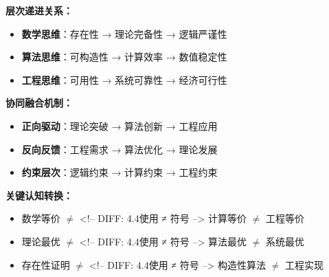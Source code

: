 \begin{tcolorbox}[colback=blue!5!white,colframe=blue!75!black,title=核心要点：三种思维的层次递进与协同融合]
\textbf{层次递进关系：}
\begin{itemize}
\item \textbf{数学思维}：存在性 → 理论完备性 → 逻辑严谨性
\item \textbf{算法思维}：可构造性 → 计算效率 → 数值稳定性
\item \textbf{工程思维}：可用性 → 系统可靠性 → 经济可行性
\end{itemize}

\textbf{协同融合机制：}
\begin{itemize}
\item \textbf{正向驱动}：理论突破 → 算法创新 → 工程应用
\item \textbf{反向反馈}：工程需求 → 算法优化 → 理论发展
\item \textbf{约束层次}：逻辑约束 → 计算约束 → 工程约束
\end{itemize}

\textbf{关键认知转换：}
\begin{itemize}
\item 数学等价 $\neq$ <!-- DIFF: 4.4使用 ≠ 符号 --> 计算等价 $\neq$ 工程等价
\item 理论最优 $\neq$ <!-- DIFF: 4.4使用 ≠ 符号 --> 算法最优 $\neq$ 系统最优
\item 存在性证明 $\neq$ <!-- DIFF: 4.4使用 ≠ 符号 --> 构造性算法 $\neq$ 工程实现
\end{itemize}
\end{tcolorbox}
